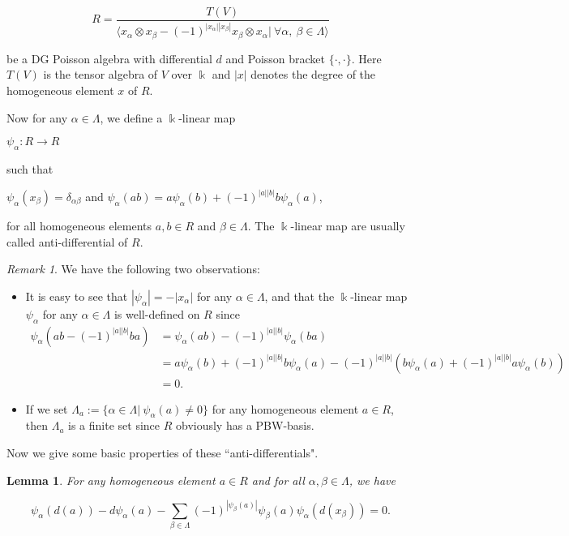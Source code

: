\documentclass[a4paper,10pt]{amsart}
\newtheorem{lemma}[theorem]{Lemma}
\theoremstyle{definition}
\theoremstyle{remark}
\newtheorem{remark}[theorem]{Remark}
\numberwithin{equation}{section}
\begin{document}
$$R=\frac{T(V)}{\langle x_{\alpha}\otimes
x_{\beta}-(-1)^{|x_{\alpha}||x_{\beta}|}x_{\beta}\otimes x_{\alpha}|
~\forall \alpha, ~\beta \in\Lambda \rangle}$$

be a DG Poisson algebra with differential $d$ and Poisson bracket
$\{\cdot, \cdot\}$. Here $T(V)$ is the tensor algebra of $V$ over $\Bbbk$ and
$|x|$ denotes the degree of the homogeneous element $x$ of $R$.

Now for any $\alpha\in \Lambda$, we define a $\Bbbk$-linear map
\begin{center}
$\psi_{\alpha}: R\rightarrow R$
\end{center}
such that
\begin{center}
$\psi_{\alpha}(x_{\beta})=\delta_{\alpha\beta}$ \quad and \quad
$\psi_{\alpha}(ab)=a\psi_{\alpha}(b)+(-1)^{|a||b|}b\psi_{\alpha}(a)$,
\end{center}
for all homogeneous elements $a, b\in R$ and $\beta\in \Lambda$. The
$\Bbbk$-linear map are usually called anti-differential of $R$.

\begin{remark}
We have the following two observations:
\begin{itemize}
  \item It is easy to see that $|\psi_{\alpha}|=-|x_{\alpha}|$ for
  any $\alpha\in \Lambda$, and that the $\Bbbk$-linear map
  $\psi_{\alpha}$ for any $\alpha\in \Lambda$ is well-defined on
  $R$ since
  \begin{equation}
\begin{split}
\psi_{\alpha}(ab-(-1)^{|a||b|}ba)&=\psi_{\alpha}(ab)-(-1)^{|a||b|}\psi_{\alpha}(ba)\\
&=a\psi_{\alpha}(b)+(-1)^{|a||b|}b\psi_{\alpha}(a)-(-1)^{|a||b|}(b\psi_{\alpha}(a)+(-1)^{|a||b|}a\psi_{\alpha}(b))\\
&=0.
\end{split}\nonumber
\end{equation}

  \item If we set $\Lambda_{a}:=\{\alpha \in \Lambda| ~\psi_{\alpha}(a)\neq
  0\}$ for any homogeneous element $a\in R$, then $\Lambda_{a}$ is a
  finite set since $R$ obviously has a PBW-basis.
\end{itemize}
\end{remark}

Now we give some basic properties of these ``anti-differentials".
\begin{lemma}\label{lem2.10}
For any homogeneous element $a \in R$ and for all $\alpha, \beta\in
\Lambda$, we have
\begin{center}
\begin{equation}
\psi_{\alpha}(d(a))-d\psi_{\alpha}(a)-\sum_{\beta\in
\Lambda}(-1)^{|\psi_{\beta}(a)|}\psi_{\beta}(a)\psi_{\alpha}(d(x_{\beta}))=0.
\end{equation}
\end{center}
\end{lemma}
\end{document}
